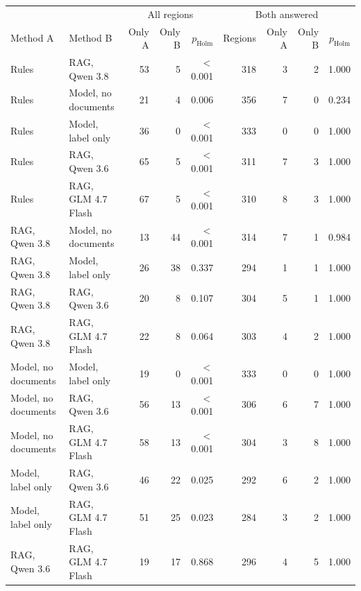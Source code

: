 \begin{tabular}{llrrrrrrr}
\toprule
 & & \multicolumn{3}{c}{All regions} & \multicolumn{4}{c}{Both answered} \\
Method A & Method B & Only A & Only B & $p_{\mathrm{Holm}}$ & Regions & Only A & Only B & $p_{\mathrm{Holm}}$ \\
\midrule
Rules & RAG, Qwen 3.8 & 53 & 5 & $<$0.001 & 318 & 3 & 2 & 1.000 \\
Rules & Model, no documents & 21 & 4 & 0.006 & 356 & 7 & 0 & 0.234 \\
Rules & Model, label only & 36 & 0 & $<$0.001 & 333 & 0 & 0 & 1.000 \\
Rules & RAG, Qwen 3.6 & 65 & 5 & $<$0.001 & 311 & 7 & 3 & 1.000 \\
Rules & RAG, GLM 4.7 Flash & 67 & 5 & $<$0.001 & 310 & 8 & 3 & 1.000 \\
RAG, Qwen 3.8 & Model, no documents & 13 & 44 & $<$0.001 & 314 & 7 & 1 & 0.984 \\
RAG, Qwen 3.8 & Model, label only & 26 & 38 & 0.337 & 294 & 1 & 1 & 1.000 \\
RAG, Qwen 3.8 & RAG, Qwen 3.6 & 20 & 8 & 0.107 & 304 & 5 & 1 & 1.000 \\
RAG, Qwen 3.8 & RAG, GLM 4.7 Flash & 22 & 8 & 0.064 & 303 & 4 & 2 & 1.000 \\
Model, no documents & Model, label only & 19 & 0 & $<$0.001 & 333 & 0 & 0 & 1.000 \\
Model, no documents & RAG, Qwen 3.6 & 56 & 13 & $<$0.001 & 306 & 6 & 7 & 1.000 \\
Model, no documents & RAG, GLM 4.7 Flash & 58 & 13 & $<$0.001 & 304 & 3 & 8 & 1.000 \\
Model, label only & RAG, Qwen 3.6 & 46 & 22 & 0.025 & 292 & 6 & 2 & 1.000 \\
Model, label only & RAG, GLM 4.7 Flash & 51 & 25 & 0.023 & 284 & 3 & 2 & 1.000 \\
RAG, Qwen 3.6 & RAG, GLM 4.7 Flash & 19 & 17 & 0.868 & 296 & 4 & 5 & 1.000 \\
\bottomrule
\end{tabular}
